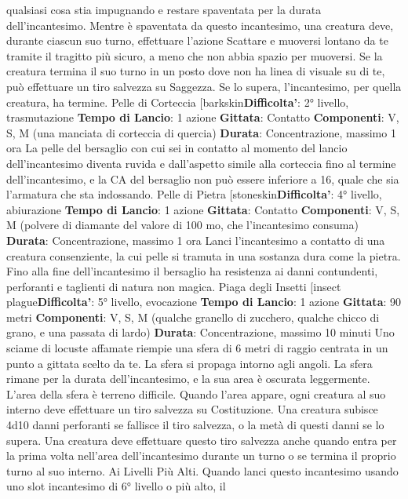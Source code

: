 \begin{multicols}{2}
qualsiasi cosa stia impugnando e restare spaventata
per la durata dell’incantesimo.
Mentre è spaventata da questo incantesimo, una
creatura deve, durante ciascun suo turno, effettuare
l’azione Scattare e muoversi lontano da te tramite il
tragitto più sicuro, a meno che non abbia spazio per
muoversi. Se la creatura termina il suo turno in un posto
dove non ha linea di visuale su di te, può effettuare un
tiro salvezza su Saggezza. Se lo supera, l’incantesimo,
per quella creatura, ha termine.
Pelle di Corteccia
[barkskin\textbf{Difficolta'}:
2° livello, trasmutazione
\textbf{Tempo di Lancio}: 1 azione
\textbf{Gittata}: Contatto
\textbf{Componenti}: V, S, M (una manciata di corteccia di
quercia)
\textbf{Durata}: Concentrazione, massimo 1 ora
La pelle del bersaglio con cui sei in contatto al
momento del lancio dell’incantesimo diventa ruvida e
dall’aspetto simile alla corteccia fino al termine
dell’incantesimo, e la CA del bersaglio non può essere
inferiore a 16, quale che sia l’armatura che sta
indossando.
Pelle di Pietra
[stoneskin\textbf{Difficolta'}:
4° livello, abiurazione
\textbf{Tempo di Lancio}: 1 azione
\textbf{Gittata}: Contatto
\textbf{Componenti}: V, S, M (polvere di diamante del valore di
100 mo, che l’incantesimo consuma)
\textbf{Durata}: Concentrazione, massimo 1 ora
Lanci l’incantesimo a contatto di una creatura
consenziente, la cui pelle si tramuta in una sostanza
dura come la pietra. Fino alla fine dell’incantesimo il
bersaglio ha resistenza ai danni contundenti, perforanti
e taglienti di natura non magica.
Piaga degli Insetti
[insect plague\textbf{Difficolta'}:
5° livello, evocazione
\textbf{Tempo di Lancio}: 1 azione
\textbf{Gittata}: 90 metri
\textbf{Componenti}: V, S, M (qualche granello di zucchero,
qualche chicco di grano, e una passata di lardo)
\textbf{Durata}: Concentrazione, massimo 10 minuti
Uno sciame di locuste affamate riempie una sfera di 6
metri di raggio centrata in un punto a gittata scelto da
te. La sfera si propaga intorno agli angoli. La sfera
rimane per la durata dell’incantesimo, e la sua area è
oscurata leggermente. L’area della sfera è terreno
difficile.
Quando l’area appare, ogni creatura al suo interno deve
effettuare un tiro salvezza su Costituzione. Una
creatura subisce 4d10 danni perforanti se fallisce il tiro
salvezza, o la metà di questi danni se lo supera. Una
creatura deve effettuare questo tiro salvezza anche
quando entra per la prima volta nell’area
dell’incantesimo durante un turno o se termina il proprio
turno al suo interno.
Ai Livelli Più Alti. Quando lanci questo incantesimo
usando uno slot incantesimo di 6° livello o più alto, il

\end{multicols}
